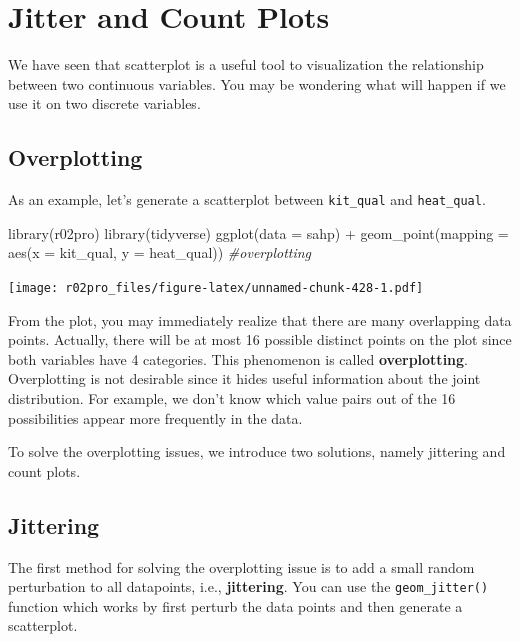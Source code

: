 \documentclass[
]{book}
\newenvironment{Shaded}{\begin{snugshade}}{\end{snugshade}}
\newcommand{\AttributeTok}[1]{\textcolor[rgb]{0.77,0.63,0.00}{#1}}
\newcommand{\CommentTok}[1]{\textcolor[rgb]{0.56,0.35,0.01}{\textit{#1}}}
\newcommand{\FunctionTok}[1]{\textcolor[rgb]{0.00,0.00,0.00}{#1}}
\newcommand{\NormalTok}[1]{#1}
\newcommand{\SpecialCharTok}[1]{\textcolor[rgb]{0.00,0.00,0.00}{#1}}
\begin{document}
\hypertarget{jitter-count}{%
\section{Jitter and Count Plots}\label{jitter-count}}

We have seen that scatterplot is a useful tool to visualization the relationship between two continuous variables. You may be wondering what will happen if we use it on two discrete variables.

\hypertarget{overplotting}{%
\subsection{Overplotting}\label{overplotting}}

As an example, let's generate a scatterplot between \texttt{kit\_qual} and \texttt{heat\_qual}.

\begin{Shaded}
\begin{Highlighting}[]
\FunctionTok{library}\NormalTok{(r02pro)}
\FunctionTok{library}\NormalTok{(tidyverse)}
\FunctionTok{ggplot}\NormalTok{(}\AttributeTok{data =}\NormalTok{ sahp) }\SpecialCharTok{+} \FunctionTok{geom\_point}\NormalTok{(}\AttributeTok{mapping =} \FunctionTok{aes}\NormalTok{(}\AttributeTok{x =}\NormalTok{ kit\_qual, }\AttributeTok{y =}\NormalTok{ heat\_qual)) }\CommentTok{\#overplotting}
\end{Highlighting}
\end{Shaded}

\texttt{[image: r02pro\_files/figure-latex/unnamed-chunk-428-1.pdf]}

From the plot, you may immediately realize that there are many overlapping data points. Actually, there will be at most 16 possible distinct points on the plot since both variables have 4 categories. This phenomenon is called \textbf{overplotting}. Overplotting is not desirable since it hides useful information about the joint distribution. For example, we don't know which value pairs out of the 16 possibilities appear more frequently in the data.

To solve the overplotting issues, we introduce two solutions, namely jittering and count plots.

\hypertarget{jitter}{%
\subsection{Jittering}\label{jitter}}

The first method for solving the overplotting issue is to add a small random perturbation to all datapoints, i.e., \textbf{jittering}. You can use the \texttt{geom\_jitter()} function which works by first perturb the data points and then generate a scatterplot.
\end{document}
